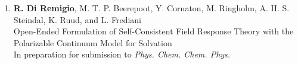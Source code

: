 \begin{enumerate}[label=\paper{\Roman{*}}, ref=\Roman{*}]
\item
  \textbf{R. Di Remigio}, M. T. P. Beerepoot, Y. Cornaton, M. Ringholm,
  A. H. S. Steindal, K. Ruud, and L. Frediani
  \\
  \textsf{
  Open-Ended Formulation of Self-Consistent Field Response Theory with
  the Polarizable Continuum Model for Solvation
  }
  \\
  In preparation for submission to \textit{Phys. Chem. Chem. Phys.}
\label{pcmopenrsp}
\end{enumerate}
